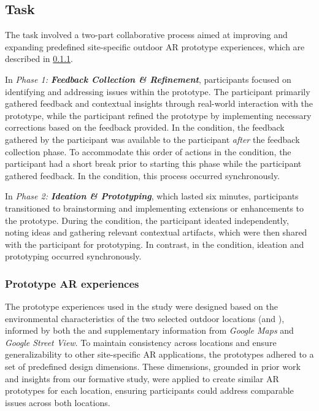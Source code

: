 \subsection{Task}
The task involved a two-part collaborative process aimed at improving and expanding predefined site-specific outdoor AR prototype experiences, which are described in \cref{sec:prototype}. 

In \textit{Phase 1: \textbf{Feedback Collection \& Refinement}}, participants focused on identifying and addressing issues within the prototype. The \insitu participant primarily gathered feedback and contextual insights through real-world interaction with the prototype, while the \exsitu participant refined the prototype by implementing necessary corrections based on the feedback provided. In the \async condition, the feedback gathered by the \insitu participant was available to the \exsitu participant \textit{after} the feedback collection phase. To accommodate this order of actions in the \async condition, the \exsitu participant had a short break prior to starting this phase while the \insitu participant gathered feedback. In the \sync condition, this process occurred synchronously.

In \textit{Phase 2: \textbf{Ideation \& Prototyping}}, which lasted six minutes, participants transitioned to brainstorming and implementing extensions or enhancements to the prototype. During the \async condition, the \insitu participant ideated independently, noting ideas and gathering relevant contextual artifacts, which were then shared with the \exsitu participant for prototyping. In contrast, in the \sync condition, ideation and prototyping occurred synchronously.

\subsubsection{Prototype AR experiences}\label{sec:prototype} The prototype experiences used in the study were designed based on the environmental characteristics of the two selected outdoor locations (\locA and \locB), informed by both the \locMesh and supplementary information from \textit{Google Maps} and \textit{Google Street View}. To maintain consistency across locations and ensure generalizability to other site-specific AR applications, the prototypes adhered to a set of predefined design dimensions. These dimensions, grounded in prior work and insights from our formative study, were applied to create similar AR prototypes for each location, ensuring participants could address comparable issues across both locations.

